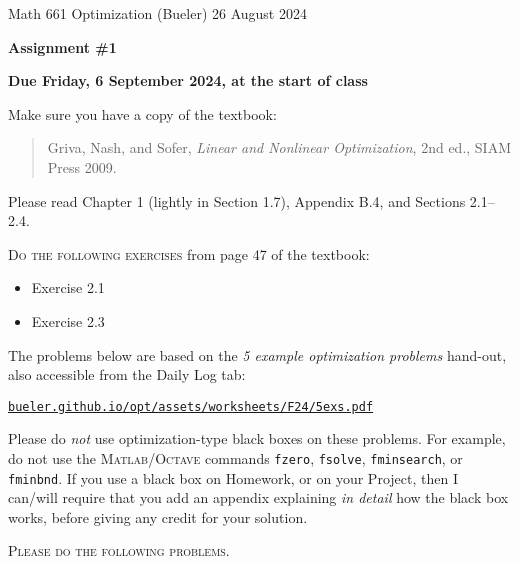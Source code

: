 \documentclass[12pt]{amsart}
\newcommand{\Matlab}{\textsc{Matlab}\xspace}
\newcommand{\Octave}{\textsc{Octave}\xspace}
\begin{document}
\scriptsize \noindent Math 661 Optimization (Bueler) \hfill 26 August 2024
\normalsize

\medskip\bigskip

\Large\centerline{\textbf{Assignment \#1}}
\large
\bigskip

\centerline{\textbf{Due Friday, 6 September 2024, at the start of class}}
\bigskip
\normalsize

\thispagestyle{empty}

\bigskip
\noindent Make sure you have a copy of the textbook:

\begin{quote}
Griva, Nash, and Sofer, \emph{Linear and Nonlinear Optimization}, 2nd ed., SIAM Press 2009.
\end{quote}

\noindent Please read Chapter 1 (lightly in Section 1.7), Appendix B.4, and Sections 2.1--2.4.

\bigskip
\noindent \textsc{Do the following exercises} from page 47 of the textbook:

\begin{itemize}
\item Exercise 2.1
\item Exercise 2.3
\end{itemize}

\bigskip
\noindent The problems below are based on the \emph{5 example optimization problems} hand-out, also accessible from the Daily Log tab:

\centerline{\href{https://bueler.github.io/opt/assets/worksheets/F24/5exs.pdf}{\texttt{bueler.github.io/opt/assets/worksheets/F24/5exs.pdf}}}

\medskip
\noindent Please do \emph{not} use optimization-type black boxes on these problems.  For example, do not use the \Matlab/\Octave commands \texttt{fzero}, \texttt{fsolve}, \texttt{fminsearch}, or \texttt{fminbnd}.  If you use a black box on Homework, or on your Project, then I can/will require that you add an appendix explaining \emph{in detail} how the black box works, before giving any credit for your solution.

\bigskip
\noindent \textsc{Please do the following problems.}
\end{document}
